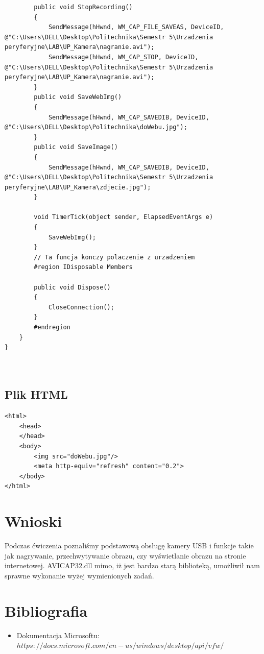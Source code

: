 \documentclass[12pt,a4paper,notitlepage]{report}
\begin{document}
\begin{adjustwidth}{0pt}{-50pt}
\begin{lstlisting}
        public void StopRecording()
        {
            SendMessage(hHwnd, WM_CAP_FILE_SAVEAS, DeviceID, @"C:\Users\DELL\Desktop\Politechnika\Semestr 5\Urzadzenia peryferyjne\LAB\UP_Kamera\nagranie.avi");
            SendMessage(hHwnd, WM_CAP_STOP, DeviceID, @"C:\Users\DELL\Desktop\Politechnika\Semestr 5\Urzadzenia peryferyjne\LAB\UP_Kamera\nagranie.avi");
        }
        public void SaveWebImg()
        {
            SendMessage(hHwnd, WM_CAP_SAVEDIB, DeviceID, @"C:\Users\DELL\Desktop\Politechnika\doWebu.jpg");
        }
        public void SaveImage()
        {
            SendMessage(hHwnd, WM_CAP_SAVEDIB, DeviceID, @"C:\Users\DELL\Desktop\Politechnika\Semestr 5\Urzadzenia peryferyjne\LAB\UP_Kamera\zdjecie.jpg");
        }

        void TimerTick(object sender, ElapsedEventArgs e)
        {
            SaveWebImg();
        }
        // Ta funcja konczy polaczenie z urzadzeniem
        #region IDisposable Members

        public void Dispose()
        {
            CloseConnection();
        }
        #endregion
    }
}



\end{lstlisting}

\subsection{Plik HTML}
\begin{lstlisting}
<html>
	<head>
	</head>
	<body>
		<img src="doWebu.jpg"/>
		<meta http-equiv="refresh" content="0.2">
	</body>
</html>
\end{lstlisting}
\end{adjustwidth}
\section{Wnioski}
Podczas ćwiczenia poznaliśmy podstawową obsługę kamery USB i funkcje takie jak nagrywanie, przechwytywanie obrazu, czy wyświetlanie obrazu na stronie internetowej. AVICAP32.dll mimo, iż jest bardzo starą biblioteką, umożliwił nam sprawne wykonanie wyżej wymienionych zadań.
\section{Bibliografia}
\begin{itemize}
\item Dokumentacja Microsoftu:
\\
$https://docs.microsoft.com/en-us/windows/desktop/api/vfw/$
\end{itemize}
\end{document}
